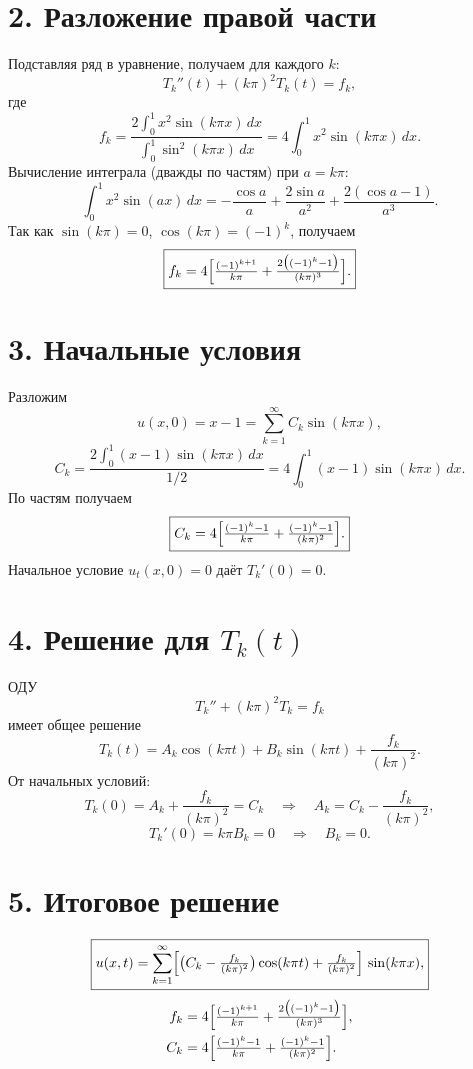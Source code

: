 \documentclass[a4paper,12pt]{article}
\begin{document}
\section*{2. Разложение правой части}

Подставляя ряд в уравнение, получаем для каждого $k$:
\[
T_k''(t)+(k\pi)^2T_k(t)=f_k,
\]
где
\[
f_k
=\frac{2\int_0^1 x^2\sin(k\pi x)\,dx}{\int_0^1\sin^2(k\pi x)\,dx}
=4\int_0^1 x^2\sin(k\pi x)\,dx.
\]
Вычисление интеграла (дважды по частям) при $a=k\pi$:
\[
\int_0^1 x^2\sin(ax)\,dx
=-\frac{\cos a}{a}
+\frac{2\sin a}{a^2}
+\frac{2(\cos a-1)}{a^3}.
\]
Так как $\sin(k\pi)=0$, $\cos(k\pi)=(-1)^k$, получаем
\[
\boxed{
f_k
=4\Bigl[\tfrac{(-1)^{k+1}}{k\pi}
+\tfrac{2\bigl((-1)^k-1\bigr)}{(k\pi)^3}\Bigr].
}
\]

\section*{3. Начальные условия}

Разложим
\[
u(x,0)=x-1=\sum_{k=1}^\infty C_k\sin(k\pi x),
\]
\[
C_k
=\frac{2\int_0^1 (x-1)\sin(k\pi x)\,dx}{1/2}
=4\int_0^1 (x-1)\sin(k\pi x)\,dx.
\]
По частям получаем
\[
\boxed{
C_k
=4\Bigl[\tfrac{(-1)^k-1}{k\pi}
+\tfrac{(-1)^k-1}{(k\pi)^2}\Bigr].
}
\]
Начальное условие $u_t(x,0)=0$ даёт $T_k'(0)=0$.

\section*{4. Решение для $T_k(t)$}

ОДУ
\[
T_k''+(k\pi)^2T_k=f_k
\]
имеет общее решение
\[
T_k(t)=A_k\cos(k\pi t)+B_k\sin(k\pi t)+\frac{f_k}{(k\pi)^2}.
\]
От начальных условий:
\[
T_k(0)=A_k+\frac{f_k}{(k\pi)^2}=C_k
\quad\Rightarrow\quad
A_k=C_k-\frac{f_k}{(k\pi)^2},
\]
\[
T_k'(0)=k\pi B_k=0\quad\Rightarrow\quad B_k=0.
\]

\section*{5. Итоговое решение}

\[
\boxed{
u(x,t)
=\sum_{k=1}^\infty
\Bigl[\bigl(C_k-\tfrac{f_k}{(k\pi)^2}\bigr)\cos(k\pi t)
      +\tfrac{f_k}{(k\pi)^2}\Bigr]\,
\sin(k\pi x),
}
\]
\[
\begin{aligned}
f_k&=4\Bigl[\tfrac{(-1)^{k+1}}{k\pi}
         +\tfrac{2\bigl((-1)^k-1\bigr)}{(k\pi)^3}\Bigr],\\
C_k&=4\Bigl[\tfrac{(-1)^k-1}{k\pi}
         +\tfrac{(-1)^k-1}{(k\pi)^2}\Bigr].
\end{aligned}
\]
\end{document}
